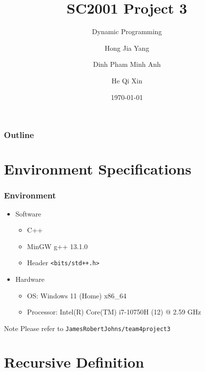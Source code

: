 \documentclass{beamer}
\title{SC2001 Project 3}
\subtitle{Dynamic Programming}
\author[Hong, Dinh, He]{Hong Jia Yang \and Dinh Pham Minh Anh \and He Qi Xin}
\institute{Team 4}
\date{\today}
\begin{document}
\begin{frame}
	\titlepage
\end{frame}

\begin{frame}
	\frametitle{Outline}
	\tableofcontents
\end{frame}

\section{Environment Specifications}
\begin{frame}
	\frametitle{Environment}
	\begin{itemize}
		\item Software
		\begin{itemize}
			\item C++
			\item MinGW g++ 13.1.0	
			\item Header \texttt{<bits/std++.h>} 
		\end{itemize}
		\item Hardware
		\begin{itemize}
			\item OS: Windows 11 (Home) x86\_64
			\item Processor: Intel(R) Core(TM) i7-10750H (12) @ 2.59 GHz
		\end{itemize}	
	\end{itemize}
	\begin{block}{Note}
		Please refer to \texttt{JamesRobertJohns/team4project3}
	\end{block}
\end{frame}

\section{Recursive Definition}
\end{document}
